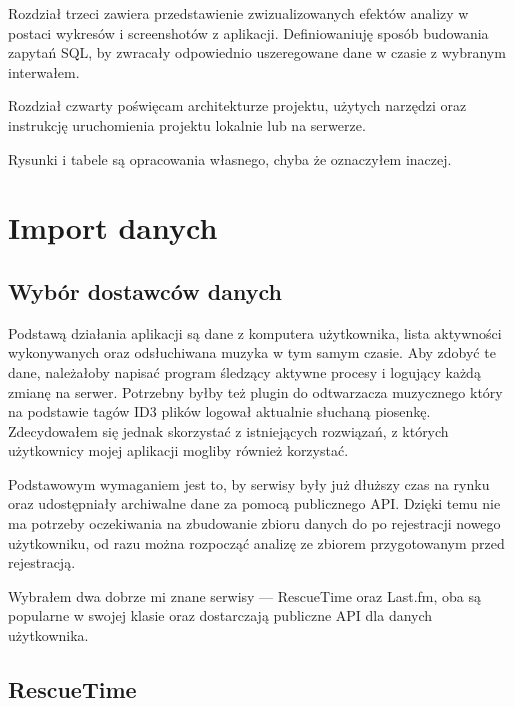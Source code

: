 \documentclass[openright]{xmgr}
\begin{document}
    Rozdział trzeci zawiera przedstawienie zwizualizowanych efektów analizy w postaci wykresów i screenshotów z aplikacji.
    Definiowaniuję sposób budowania zapytań SQL, by zwracały odpowiednio uszeregowane dane w czasie z wybranym interwałem.

    Rozdział czwarty poświęcam architekturze projektu, użytych narzędzi oraz instrukcję uruchomienia projektu lokalnie lub na serwerze.

    Rysunki i tabele są opracowania własnego, chyba że oznaczyłem inaczej.

\chapter{Import danych}

    \section{Wybór dostawców danych}

    Podstawą działania aplikacji są dane z komputera użytkownika,
    lista aktywności wykonywanych oraz odsłuchiwana muzyka w tym samym czasie.
    Aby zdobyć te dane, należałoby napisać program śledzący aktywne procesy i logujący każdą zmianę na serwer.
    Potrzebny byłby też plugin do odtwarzacza muzycznego który na podstawie tagów ID3 plików logował aktualnie słuchaną piosenkę.
    Zdecydowałem się jednak skorzystać z istniejących rozwiązań, z których użytkownicy mojej aplikacji mogliby również korzystać.

    Podstawowym wymaganiem jest to, by serwisy były już dłuższy czas na rynku oraz udostępniały archiwalne dane za pomocą publicznego API.
    Dzięki temu nie ma potrzeby oczekiwania na zbudowanie zbioru danych do po rejestracji nowego użytkowniku,
    od razu można rozpocząć analizę ze zbiorem przygotowanym przed rejestracją.

    Wybrałem dwa dobrze mi znane serwisy --- RescueTime oraz Last.fm,
    oba są popularne w swojej klasie oraz dostarczają publiczne API dla danych użytkownika.

        \section*{RescueTime}
\end{document}
